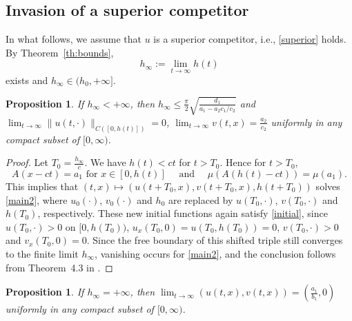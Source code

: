 \documentclass[reqno]{amsart}
\newcommand{\rev}[1]{#1}
\theoremstyle{plain}
\newtheorem{proposition}[theorem]{Proposition}
\theoremstyle{definition}
\theoremstyle{remark}
\begin{document}
	\subsection{Invasion of a superior competitor}
	In what follows, we assume that $u$ is a superior competitor, i.e., \eqref{superior}
	holds. By Theorem~\ref{th:bounds},
	\[
	h_\infty := \lim_{t\to\infty} h(t)
	\]
	exists and $h_\infty \in (h_0, +\infty]$.
	
	\begin{proposition}\label{prop:vanishing}
		If $h_\infty < +\infty$, then $h_\infty \le
		\frac{\pi}{2}\sqrt{\frac{d_1}{a_1-a_2c_1/c_2}}$ and
		$\lim_{t\to\infty} \|u(t,\cdot)\|_{C([0,h(t)])} = 0$,
		$\lim_{t\to\infty} v(t,x) = \frac{a_2}{c_2}$ uniformly in any compact subset
		of $[0, \infty)$.
	\end{proposition}
	
	\begin{proof}
		Let $T_0 = \frac{h_\infty}{c}$. We have $h(t) < ct$ for $t>T_0$. Hence for
		$t>T_0$,
		\[
		A(x-ct) = a_1 \text{ for } x \in [0,h(t)]
		\quad\text{ and }\quad
		\mu(A(h(t)-ct)) = \mu(a_1).
		\]
		This implies that $(t,x) \mapsto (u(t+T_0, x), v(t+T_0, x), h(t+T_0))$ solves
		\eqref{main2}, where $u_0(\cdot)$, $v_0(\cdot)$ and $h_0$ are replaced by
		$u(T_0,\cdot)$, $v(T_0,\cdot)$ and $h(T_0)$, respectively\rev{. These new
		initial functions again satisfy \eqref{initial}, since $u(T_0,\cdot)>0$ on
		$[0,h(T_0))$, $u_x(T_0,0)=u(T_0,h(T_0))=0$, $v(T_0,\cdot)>0$ and
		$v_x(T_0,0)=0$}. \rev{Since the free boundary of this shifted triple still
		converges to the finite limit $h_\infty$, vanishing occurs for
		\eqref{main2}, and the conclusion} follows from Theorem~4.3 in \cite{MR3327894}.
	\end{proof}
	
	\begin{proposition}\label{prop:spreading}
		If $h_\infty = +\infty$, then $\lim_{t\to\infty} (u(t,x), v(t,x)) =
		\left(\frac{a_1}{b_1},0\right)$ uniformly in any compact subset of
		$[0, \infty)$.
	\end{proposition}
	
\end{document}
